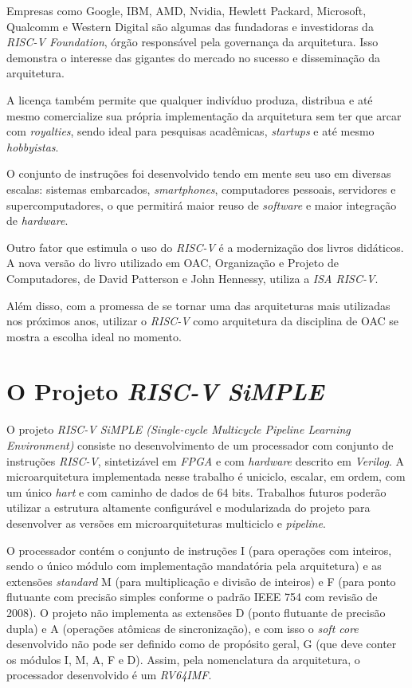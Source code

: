 {
    Empresas como Google, IBM, AMD, Nvidia, Hewlett Packard, Microsoft,
    Qualcomm e Western Digital são algumas das fundadoras e investidoras
    da \textit{RISC-V Foundation}, órgão responsável pela governança da
    arquitetura. Isso demonstra o interesse das gigantes do mercado no
    sucesso e disseminação da arquitetura.
}

{
    A licença também permite que qualquer indivíduo produza, distribua e
    até mesmo comercialize sua própria implementação da arquitetura sem ter
    que arcar com \textit{royalties}, sendo ideal para pesquisas
    acadêmicas, \textit{startups} e até mesmo \textit{hobbyistas}.
}

{
    O conjunto de instruções foi desenvolvido tendo em mente seu uso em
    diversas escalas: sistemas embarcados, \textit{smartphones},
    computadores pessoais, servidores e supercomputadores, o que permitirá
    maior reuso de \textit{software} e maior integração de
    \textit{hardware}.
}

{
    Outro fator que estimula o uso do \textit{RISC-V} é a modernização dos
    livros didáticos. A nova versão do livro utilizado em OAC, Organização
    e Projeto de Computadores, de David Patterson e John Hennessy, utiliza
    a \textit{ISA RISC-V}.
}

{
    Além disso, com a promessa de se tornar uma das arquiteturas mais
    utilizadas nos próximos anos, utilizar o \textit{RISC-V} como
    arquitetura da disciplina de OAC se mostra a escolha ideal no momento.
}

\section{O Projeto \textit{RISC-V SiMPLE}}
{
    O projeto \textit{RISC-V SiMPLE (Single-cycle Multicycle Pipeline
    Learning Environment)} consiste no desenvolvimento de um processador
    com conjunto de instruções \textit{RISC-V}, sintetizável em
    \textit{FPGA} e com \textit{hardware} descrito em \textit{Verilog}. A
    microarquitetura implementada nesse trabalho é uniciclo, escalar, em
    ordem, com um único \textit{hart} e com caminho de dados de 64 bits.
    Trabalhos futuros poderão utilizar a estrutura altamente configurável
    e modularizada do projeto para desenvolver as versões em
    microarquiteturas multiciclo e \textit{pipeline}.
}

{
    O processador contém o conjunto de instruções I (para operações com
    inteiros, sendo o único módulo com implementação mandatória pela
    arquitetura) e as extensões \textit{standard} M (para multiplicação e
    divisão de inteiros) e F (para ponto flutuante com precisão simples
    conforme o padrão IEEE 754 com revisão de 2008). O projeto não
    implementa as extensões D (ponto flutuante de precisão dupla) e A
    (operações atômicas de sincronização), e com isso o \textit{soft core}
    desenvolvido não pode ser definido como de propósito geral, G (que deve
    conter os módulos I, M, A, F e D). Assim, pela nomenclatura da
    arquitetura, o processador desenvolvido é um \textit{RV64IMF}.
}

